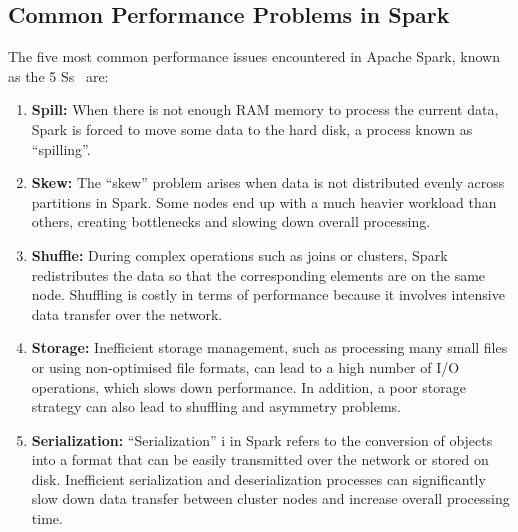\documentclass[12pt,oneside]{book} %
\begin{document}
\subsection{Common Performance Problems in Spark}
The five most common performance issues encountered in Apache Spark, known as
the 5 Ss~\cite{ApacheSparkOptimizationTechniques} are:
\begin{enumerate}
    \itemindent=17.87pt
    \item \textbf{Spill:} When there is not enough RAM memory to process the current data,  Spark is forced to move some data to the hard disk, a process known as ``spilling''.
    \item \textbf{Skew:} The ``skew'' problem arises when data is not distributed evenly across partitions in Spark. Some nodes end up with a much heavier workload than others, creating bottlenecks and slowing down overall processing.
    \item \textbf{Shuffle:} During complex operations such as joins or clusters, Spark redistributes the data so that the corresponding elements are on the same node. Shuffling is costly in terms of performance because it involves intensive data transfer over the network.
    \item \textbf{Storage:} Inefficient storage management, such as processing many small files or using non-optimised file formats, can lead to a high number of I/O operations, which slows down performance. In addition, a poor storage strategy can also lead to shuffling and asymmetry problems.
    \item \textbf{Serialization:} ``Serialization'' i in Spark refers to the conversion of objects into a format that can be easily transmitted over the network or stored on disk. Inefficient serialization and deserialization processes can significantly slow down data transfer between cluster nodes and increase overall processing time.
\end{enumerate}
\end{document}
